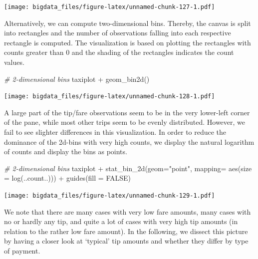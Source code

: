 \documentclass[
  12pt,
]{style/krantz}
\newenvironment{Shaded}{\begin{snugshade}}{\end{snugshade}}
\newcommand{\AttributeTok}[1]{\textcolor[rgb]{0.77,0.63,0.00}{#1}}
\newcommand{\CommentTok}[1]{\textcolor[rgb]{0.56,0.35,0.01}{\textit{#1}}}
\newcommand{\ConstantTok}[1]{\textcolor[rgb]{0.00,0.00,0.00}{#1}}
\newcommand{\FunctionTok}[1]{\textcolor[rgb]{0.00,0.00,0.00}{#1}}
\newcommand{\NormalTok}[1]{#1}
\newcommand{\SpecialCharTok}[1]{\textcolor[rgb]{0.00,0.00,0.00}{#1}}
\newcommand{\StringTok}[1]{\textcolor[rgb]{0.31,0.60,0.02}{#1}}
\begin{document}
\texttt{[image: bigdata\_files/figure-latex/unnamed-chunk-127-1.pdf]}

Alternatively, we can compute two-dimensional bins. Thereby, the canvas is split into rectangles and the number of observations falling into each respective rectangle is computed. The visualization is based on plotting the rectangles with counts greater than 0 and the shading of the rectangles indicates the count values.

\begin{Shaded}
\begin{Highlighting}[]
\CommentTok{\# 2{-}dimensional bins}
\NormalTok{taxiplot }\SpecialCharTok{+}
     \FunctionTok{geom\_bin2d}\NormalTok{()}
\end{Highlighting}
\end{Shaded}

\texttt{[image: bigdata\_files/figure-latex/unnamed-chunk-128-1.pdf]}

A large part of the tip/fare observations seem to be in the very lower-left corner of the pane, while most other trips seem to be evenly distributed. However, we fail to see slighter differences in this visualization. In order to reduce the dominance of the 2d-bins with very high counts, we display the natural logarithm of counts and display the bins as points.

\begin{Shaded}
\begin{Highlighting}[]
\CommentTok{\# 2{-}dimensional bins}
\NormalTok{taxiplot }\SpecialCharTok{+}
     \FunctionTok{stat\_bin\_2d}\NormalTok{(}\AttributeTok{geom=}\StringTok{"point"}\NormalTok{,}
                 \AttributeTok{mapping=} \FunctionTok{aes}\NormalTok{(}\AttributeTok{size =} \FunctionTok{log}\NormalTok{(..count..))) }\SpecialCharTok{+}
     \FunctionTok{guides}\NormalTok{(}\AttributeTok{fill =} \ConstantTok{FALSE}\NormalTok{)}
\end{Highlighting}
\end{Shaded}

\texttt{[image: bigdata\_files/figure-latex/unnamed-chunk-129-1.pdf]}

We note that there are many cases with very low fare amounts, many cases with no or hardly any tip, and quite a lot of cases with very high tip amounts (in relation to the rather low fare amount). In the following, we dissect this picture by having a closer look at `typical' tip amounts and whether they differ by type of payment.
\end{document}
